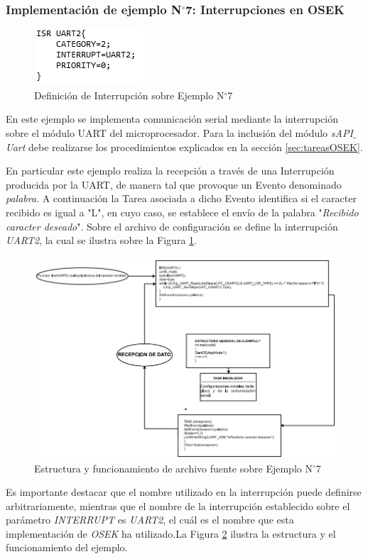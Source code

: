 \documentclass[12pt,letterpaper]{article}
\begin{document}
\subsubsection{Implementación de ejemplo N$^{\circ}$7: Interrupciones en OSEK}
\begin{figure}[!h]
\centering
\includegraphics[width=5 cm]{figuras/f35.png}
\caption{Definición de Interrupción sobre Ejemplo N$^{\circ}$7}
\label{Fig44}
\end{figure}
En este ejemplo se implementa comunicación serial mediante la interrupción sobre el módulo UART del microprocesador. Para la inclusión del módulo \textit{sAPI$\_$Uart} debe realizarse los procedimientos explicados en la sección \ref{sec:tareasOSEK}. 

En particular este ejemplo realiza la recepción a través de una Interrupción producida por la UART, de manera tal que provoque un Evento denominado \textit{palabra}. A continuación la Tarea asociada a dicho Evento identifica si el caracter recibido es igual a "L", en cuyo caso, se establece el envío de la palabra "\textit{Recibido caracter deseado}". Sobre el archivo de configuración se define la interrupción \textit{UART2}, la cual se ilustra sobre la Figura \ref{Fig44}.
\begin{center}
\begin{figure}[!h]
\centering
\includegraphics[width=15 cm]{figuras/f38.png}
\caption{Estructura y funcionamiento de archivo fuente sobre Ejemplo N$^{\circ}$7}
\label{Fig45}
\end{figure}
\end{center}
Es importante destacar que el nombre utilizado en la interrupción puede definirse arbitrariamente, mientras que el nombre de la interrupción establecido sobre el parámetro \textit{INTERRUPT} es \textit{UART2}, el cuál es el nombre que esta implementación de \textit{OSEK} ha utilizado.La Figura \ref{Fig45} ilustra la estructura y el funcionamiento del ejemplo.
\end{document}
